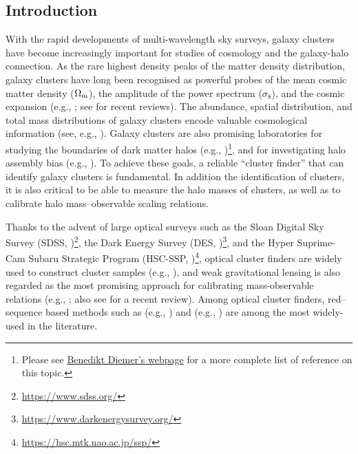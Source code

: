 \documentclass[fleqn,usenatbib,useAMS]{mnras}
\begin{document}
\begin{CJK*}{UTF8}{gbsn}
\section{Introduction}
    \label{sec:intro}
    
    With the rapid developments of multi-wavelength sky surveys, galaxy clusters have become
    increasingly important for studies of cosmology and the galaxy-halo connection.
    As the rare highest density peaks of the matter density distribution, galaxy clusters have long
    been recognised as powerful probes of the mean cosmic matter density ($\Omega_{\rm m}$), the
    amplitude of the power spectrum ($\sigma_{8}$), and the cosmic expansion (e.g.,
    \citealt{Evrard1989, Peebles1989, White1993, Viana1996, Wang1998, Wagoner2021}; see
    \citealt{Allen2011, Kravtsov2012, Weinberg2013} for recent reviews).
    The abundance, spatial distribution, and total mass distributions of galaxy clusters encode
    valuable cosmological information (see, e.g., \citealt{Haiman2001, Holder2001, Vikhlinin2009b,
    Rozo2010, Benson2013, Mantz2014, Bocquet2019, Abbott2020, To2021a, To2021b, Wu2021}). 
    Galaxy clusters are also promising laboratories for studying the boundaries of dark matter halos
    (e.g., \citealt{Diemer2014, More2015b, More2016, Chang2018, Shin2019, Zurcher2019, Tomooka2020,
    Xhakaj2020})\footnote{Please see
    \href{http://www.benediktdiemer.com/research/splashback/}{Benedikt Diemer's webpage} for a more
    complete list of reference on this topic.}, and for investigating halo assembly bias (e.g.,
    \citealt{Tinker2012, Miyatake2016, Zu2017}).
    To achieve these goals, a reliable ``cluster finder'' that can identify galaxy clusters 
    is fundamental. 
    In addition the identification of clusters, it is also critical to be able to measure the 
    halo masses of clusters, as well as to calibrate halo mass--observable scaling relations.

    Thanks to the advent of large optical surveys such as the Sloan Digital Sky Survey (SDSS,
    \citealt{York2000, SDSSDR7, SDSSDR16})\footnote{\url{https://www.sdss.org/}}, 
    the Dark Energy Survey (DES, \citealt{DES2016, Abbott2018,
    DES2021})\footnote{\url{https://www.darkenergysurvey.org/}}, and the Hyper Suprime-Cam Subaru
    Strategic Program (HSC-SSP, \citealt{Miyazaki2012, HSC-SSP, HSC-DR1,
    HSC-DR2})\footnote{\url{https://hsc.mtk.nao.ac.jp/ssp/}}, optical cluster finders
    are widely used to construct cluster samples (e.g., \citealt{Kepner1999,
    GladdersYee2000, Koester2007, Hao2010, Wen2012, Rykoff2014, Oguri2018, Aguena2021, Wen2021,
    Zou2021}), and weak gravitational lensing is also regarded
    as the most promising approach for calibrating mass-observable relations
    (e.g., \citealt{Leauthaud2010, Becker2011, vonderLinden2014, Applegate2014, 
    Applegate2016, Okabe2016, Grandis2019}; also see \citealt{Umetsu2020b} for a recent review).
    Among optical cluster finders, red--sequence based methods such as \redm{} (e.g.,
    \citealt{Rykoff2014, Rozo2014, Rozo2015a, Rozo2015b, Rykoff2016}) and \camira{} (e.g.,
    \citealt{Oguri2014, Oguri2018}) are among the most widely-used in the literature.


\end{CJK*}
\end{document}
